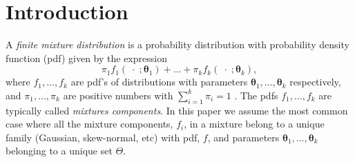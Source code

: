 \documentclass[12pt, a4paper]{article}
\newcommand{\m}[1]{\boldsymbol{#1}}
\begin{document}



\section{Introduction}

\noindent  A \emph{finite mixture distribution} is a probability distribution with probability density function (pdf) given by the expression
\begin{equation}\label{mixt}
\pi_1 f_1(\;\cdot\; ; \m\theta_1) + \dots + \pi_k f_k(\;\cdot\; ; \m\theta_k),
\end{equation}
where $f_1, \dots, f_k$ are pdf's of distributions with parameters $\m\theta_1, \dots, \m\theta_k$ respectively, and $\pi_1, \dots, \pi_k$ are positive numbers with $\sum_{i=1}^k \pi_i = 1$ \citep{mclachlan2000finite}. The pdfs $f_1, \dots, f_k$ are typically called \emph{mixtures components}. In this paper we assume the most common case where all the mixture components, $f_i$, in a mixture belong to a unique family (Gaussian, skew-normal, etc) with pdf, $f$, and parameters $\m\theta_1, \dots, \m\theta_k$ belonging to a unique set $\Theta$. 
\end{document}
